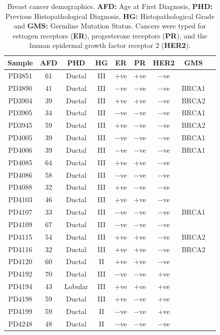 \documentclass[11pt]{amsart}
\theoremstyle{definition}
\begin{document}
\begin{table}
\begin{center}
\begin{tabular}{ccccccccc}%
{\bf Sample} & {\bf AFD} & {\bf PHD} & {\bf HG} & {\bf ER }
& {\bf PR } & {\bf HER2} & {\bf GMS} \\ \hline
  PD3851& 61& Ductal& III& $+$ve& $+$ve& $-$ve &  \\ %
  PD3890& 41& Ductal& III& $-$ve& $-$ve& $-$ve & BRCA1 \\ %
  PD3904& 39& Ductal& III& $+$ve& $+$ve& $-$ve & BRCA2 \\ %
  PD3905& 34& Ductal& III& $-$ve& $-$ve& $-$ve & BRCA1 \\ %
  PD3945& 59& Ductal& III& $+$ve& $-$ve& $-$ve & BRCA2 \\ %
  PD4005& 39& Ductal& III& $-$ve& $-$ve& $-$ve & BRCA1 \\ %
  PD4006& 39& Ductal& III& $-$ve& $-$ve& $-$ve & BRCA1 \\ %
  PD4085& 64& Ductal& III& $+$ve& $+$ve& $-$ve &  \\ %
  PD4086& 58& Ductal& III& $-$ve& $-$ve& $-$ve &  \\ %
  PD4088& 32& Ductal& III& $+$ve& $-$ve& $-$ve &  \\ %
  PD4103& 46& Ductal& III& $+$ve& $+$ve& $-$ve &  \\ %
  PD4107& 33& Ductal& III& $-$ve& $-$ve& $-$ve & BRCA1 \\ %
  PD4109& 67& Ductal& III& $-$ve& $-$ve& $-$ve &  \\ %
  PD4115& 54& Ductal& III& $+$ve& $+$ve& $-$ve & BRCA2 \\ %
  PD4116& 32& Ductal& III& $+$ve& $+$ve& $-$ve & BRCA2 \\ %
  PD4120& 60& Ductal& II& $+$ve& $+$ve& $-$ve &  \\ %
  PD4192& 70& Ductal& III& $-$ve& $-$ve& $+$ve &  \\ %
  PD4194& 43& Lobular& III& $+$ve& $+$ve& $+$ve &  \\ %
  PD4198& 59& Ductal& III& $+$ve& $-$ve& $+$ve & \\ %
  PD4199& 59& Ductal& II& $-$ve& $-$ve& $+$ve & \\ %
  PD4248& 48& Ductal& II& $-$ve& $-$ve& $-$ve & \\[1em] %
\end{tabular}\caption{Breast cancer demographics. {\bf AFD:} Age at
  First Diagnosis, {\bf PHD:} Previous Histopathological Diagnosis,
  {\bf HG:}  Histopathological Grade and {\bf GMS:} Germline Mutation
  Status. Cancers were typed for estrogen receptors ({\bf ER}),
  progesterone receptors ({\bf PR}), and the human epidermal growth
  factor receptor 2 ({\bf HER2}).}\label{tab:tableA}
\end{center}
\end{table}
\end{document}
